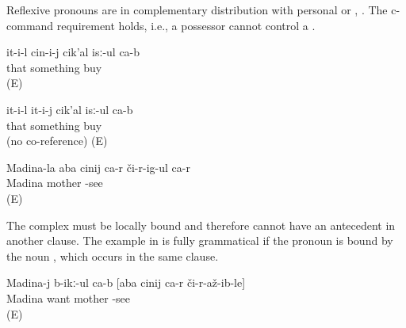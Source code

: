 Reflexive pronouns are in complementary distribution with personal or  , . The c-command requirement holds, i.e., a possessor cannot control a  .
%
\begin{exe}
	\ex	\label{ex:S/he buys himself something}
	\gll	it-i-l	cin-i-j	cik'al	isː-ul	ca-b\\
		that		something	buy	\\
	\glt	{} (E)

	\ex	\label{ex:S/he buys him/her something}
	\gll	it-i-l	it-i-j	cik'al	isː-ul	ca-b\\
		that		something	buy		\\
	\glt	{} (no co-reference) (E)

	\ex	\label{ex:Madina's mother sees herself@11a}
	\gll	Madina-la	aba	cinij	ca-r	či-r-ig-ul ca-r\\
		Madina	mother			-see \\
	\glt	{} (E)
\end{exe}

The complex  must be locally bound  and therefore cannot have an antecedent in another clause. The example in  is fully grammatical if the pronoun is bound by the noun  , which occurs in the same clause.
%
\begin{exe}
	\ex	\label{ex:Madina wants that the mother sees herself@11b}
	\gll	Madina-j	b-ikː-ul ca-b	[aba	cinij	ca-r	či-r-až-ib-le]\\
		Madina	want 	mother			-see\\
	\glt	{} (E)
\end{exe}

